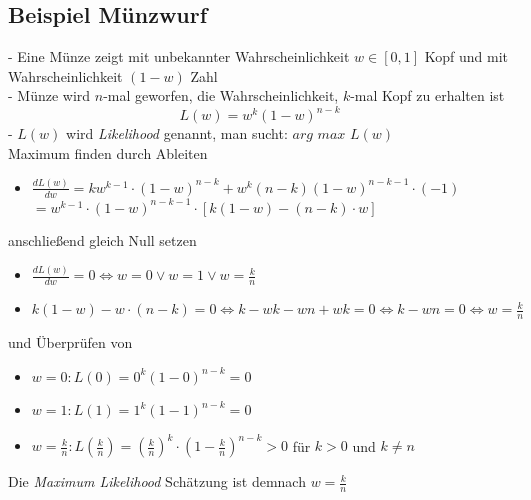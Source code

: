 \documentclass{report}
\begin{document}
\subsection{Beispiel Münzwurf}
- Eine Münze zeigt mit unbekannter Wahrscheinlichkeit $w \in [0, 1]$ Kopf und mit Wahrscheinlichkeit $(1 - w)$ Zahl\\
- Münze wird $n$-mal geworfen, die Wahrscheinlichkeit, $k$-mal Kopf zu erhalten ist\\
$$L(w) = w^k(1 - w)^{n-k}$$
- $L(w)$ wird \textit{Likelihood} genannt, man sucht: $arg$ $max$ $L(w)$\\
Maximum finden durch Ableiten\\
\vspace*{-1.25em}
\begin{itemize}
  \item $\frac{dL(w)}{dw} = kw^{k-1}\cdot(1 - w)^{n-k} + w^k(n-k)(1-w)^{n-k-1}\cdot(-1)$\\
  $ = w^{k-1}\cdot (1-w)^{n-k-1}\cdot[k(1-w)-(n-k)\cdot w]$
\end{itemize}
anschließend gleich Null setzen\\
\vspace*{-1.25em}
\begin{itemize}
  \item $\frac{dL(w)}{dw} = 0 \Leftrightarrow w = 0 \lor w = 1 \lor w = \frac{k}{n}$
  \item $k(1-w) - w\cdot(n - k) = 0 \Leftrightarrow k -wk - wn + wk = 0 \Leftrightarrow k - wn = 0 \Leftrightarrow w = \frac{k}{n}$
\end{itemize}
und Überprüfen von\\
\vspace*{-1.25em}
\begin{itemize}
  \item $w = 0: L(0) = 0^k(1 - 0)^{n-k} = 0$
  \item $w = 1: L(1) = 1^k(1 - 1)^{n-k} = 0$
  \item $w = \frac{k}{n}: L(\frac{k}{n}) = (\frac{k}{n})^k\cdot (1 - \frac{k}{n})^{n-k} > 0$ für $k > 0$ und $k \neq n$
\end{itemize}
Die \textit{Maximum Likelihood} Schätzung ist demnach $w = \frac{k}{n}$
\end{document}
